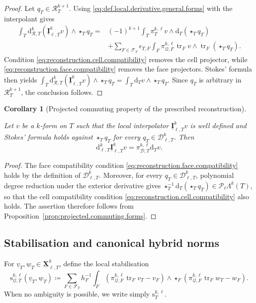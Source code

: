 \documentclass[a4paper,11pt]{article}
\newtheorem{corollary}[theorem]{Corollary}
\theoremstyle{definition}
\newcommand{\DIFF}{\mathrm{d}}
\newcommand{\PL}[2]{\mathcal{P}_{#1}\Lambda^{#2}}
\newcommand{\uX}[2]{\underline{\boldsymbol{X}}_{\ell,#2}^{#1}}
\newcommand{\uI}[2]{\underline{\boldsymbol{I}}_{\ell,#2}^{#1}}
\newcommand{\piQ}[2]{\pi_{\mathcal Q,#1}^{#2,\ell}}
\newcommand{\Dpoly}[2]{\mathcal D_{\ell,#1}^{#2}}
\newcommand{\piD}[2]{\pi_{\mathcal D,#1}^{#2,\ell}}
\newcommand{\trc}{\operatorname{tr}}
\newcommand{\epsTF}{\epsilon_{T,F}}
\begin{document}
\begin{proof}
Let $q_T\in\mathcal R_T^{k+1}$.
Using \eqref{eq:def.local.derivative.general.forms} with the interpolant gives
\[
\begin{aligned}
  \int_T
  \DIFF_{\mathcal R,T}^{k}(\uI{k}{T}v)
  \wedge\star_Tq_T
  ={}&
  (-1)^{k+1}
  \int_T
  \pi_T^{k,\ell}v
  \wedge
  \DIFF_T(\star_Tq_T)
  \\
  &+
  \sum_{F\in\mathcal F_T}
  \epsTF
  \int_F
  \piQ{F}{k}\trc_Fv
  \wedge
  \trc_F(\star_Tq_T).
\end{aligned}
\]
Condition \eqref{eq:reconstruction.cell.compatibility} removes the cell projector, while \eqref{eq:reconstruction.face.compatibility} removes the face projectors.
Stokes' formula then yields $\int_T \DIFF_{\mathcal R,T}^{k}(\uI{k}{T}v) \wedge\star_Tq_T = \int_T \DIFF_Tv\wedge\star_Tq_T$.
Since $q_T$ is arbitrary in $\mathcal R_T^{k+1}$, the conclusion follows.
\end{proof}

\begin{corollary}[Projected commuting property of the prescribed reconstruction]
\label{cor:prescribed.projected.commuting.forms}

Let $v$ be a $k$-form on $T$ such that the local interpolator $\uI{k}{T}v$ is well defined and Stokes' formula holds against $\star_Tq_T$ for every $q_T\in\Dpoly{T}{k}$.
Then
\[
  \DIFF_{\ell,T}^{k}\uI{k}{T}v
  =
  \piD{T}{k}\DIFF_Tv.
\]
\end{corollary}
\begin{proof}
The face compatibility condition \eqref{eq:reconstruction.face.compatibility} holds by the definition of $\Dpoly{T}{k}$.
Moreover, for every $q_T\in\Dpoly{T}{k}$, polynomial degree reduction under the exterior derivative gives $\star_T^{-1}\DIFF_T(\star_Tq_T)\in\PL{\ell}{k}(T)$, so that the cell compatibility condition \eqref{eq:reconstruction.cell.compatibility} also holds.
The assertion therefore follows from Proposition~\ref{prop:projected.commuting.forms}.
\end{proof}

\subsection{Stabilisation and canonical hybrid norms}
\label{subsec:stabilization.hybrid.norms}

For $\underline v_T,\underline w_T\in\uX{k}{T}$, define the local stabilisation
\begin{equation}\label{eq:def.stabilization.forms}
  \mathrm s_{\mathcal Q,T}^{k,\ell}
  (\underline v_T,\underline w_T)
  \coloneqq
  \sum_{F\in\mathcal F_T}
  h_F^{-1}
  \int_F
  \left(
    \piQ{F}{k}\trc_Fv_T-v_F
  \right)
  \wedge
  \star_F
  \left(
    \piQ{F}{k}\trc_Fw_T-w_F
  \right).
\end{equation}
When no ambiguity is possible, we write simply $\mathrm s_T^{k,\ell}$.
\end{document}

